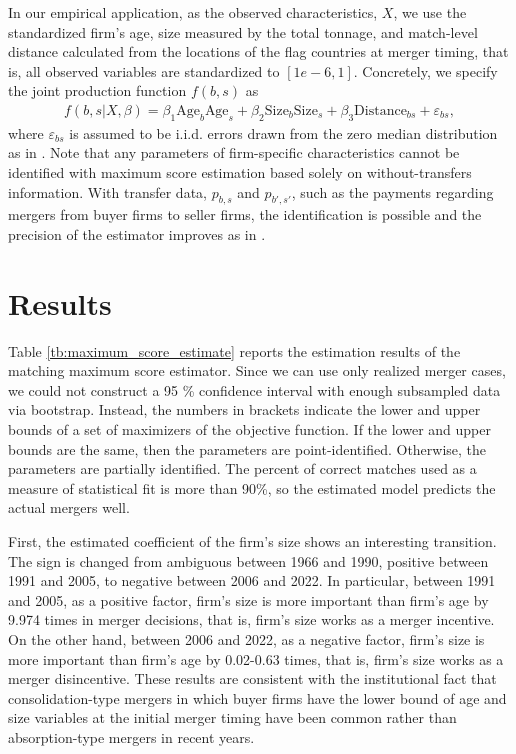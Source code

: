 \documentclass[10pt]{article}
\begin{document}
In our empirical application, as the observed characteristics, $X$, we use the standardized firm's age, size measured by the total tonnage, and match-level distance calculated from the locations of the flag countries at merger timing, that is, all observed variables are standardized to $[1e-6,1]$. 
Concretely, we specify the joint production function $f(b,s)$ as
\begin{align}
    f(b,s|X,\beta)= \beta_1 \text{Age}_{b}\text{Age}_{s} + \beta_2 \text{Size}_{b}\text{Size}_{s} + \beta_3 \text{Distance}_{bs} + \varepsilon_{bs},\label{eq:joint_production}
\end{align}
where $\varepsilon_{bs}$ is assumed to be i.i.d. errors drawn from the zero median distribution as in \cite{fox2018qe}. 
Note that any parameters of firm-specific characteristics cannot be identified with maximum score estimation based solely on without-transfers information. With transfer data, $p_{b,s}$ and $p_{b',s'}$, such as the payments regarding mergers from buyer firms to seller firms, the identification is possible and the precision of the estimator improves as in \cite{akkus2015ms}.


\section{Results}\label{sec:results}

Table \ref{tb:maximum_score_estimate} reports the estimation results of the matching maximum score estimator. 
Since we can use only realized merger cases, we could not construct a 95 \% confidence interval with enough subsampled data via bootstrap.
Instead, the numbers in brackets indicate the lower and upper bounds of a set of maximizers of the objective function. 
If the lower and upper bounds are the same, then the parameters are point-identified. 
Otherwise, the parameters are partially identified.
The percent of correct matches used as a measure of statistical fit is more than 90\%, so the estimated model predicts the actual mergers well.

First, the estimated coefficient of the firm's size shows an interesting transition. 
The sign is changed from ambiguous between 1966 and 1990, positive between 1991 and 2005, to negative between 2006 and 2022. 
In particular, between 1991 and 2005, as a positive factor, firm's size is more important than firm's age by 9.974 times in merger decisions, that is, firm's size works as a merger incentive.
On the other hand, between 2006 and 2022, as a negative factor, firm's size is more important than firm's age by 0.02-0.63 times, that is, firm's size works as a merger disincentive.
These results are consistent with the institutional fact that consolidation-type mergers in which buyer firms have the lower bound of age and size variables at the initial merger timing have been common rather than absorption-type mergers in recent years.
\end{document}
